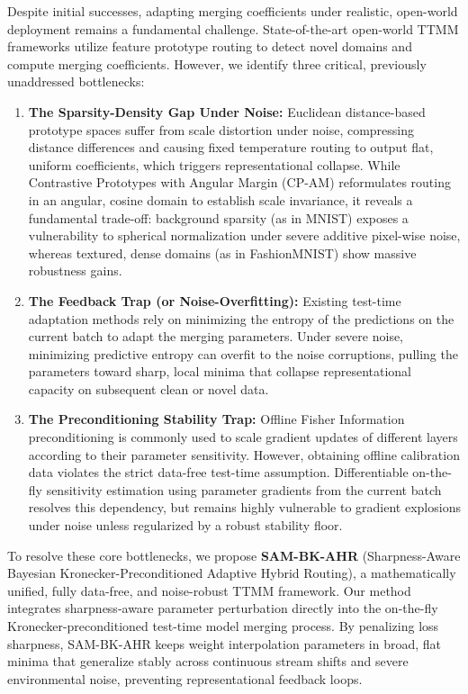 \documentclass{article}
\theoremstyle{plain}
\theoremstyle{definition}
\theoremstyle{remark}
\begin{document}
Despite initial successes, adapting merging coefficients under realistic, open-world deployment remains a fundamental challenge. State-of-the-art open-world TTMM frameworks utilize feature prototype routing to detect novel domains and compute merging coefficients. However, we identify three critical, previously unaddressed bottlenecks:
\begin{enumerate}
    \item \textbf{The Sparsity-Density Gap Under Noise:} Euclidean distance-based prototype spaces suffer from scale distortion under noise, compressing distance differences and causing fixed temperature routing to output flat, uniform coefficients, which triggers representational collapse. While Contrastive Prototypes with Angular Margin (CP-AM) reformulates routing in an angular, cosine domain to establish scale invariance, it reveals a fundamental trade-off: background sparsity (as in MNIST) exposes a vulnerability to spherical normalization under severe additive pixel-wise noise, whereas textured, dense domains (as in FashionMNIST) show massive robustness gains.
    \item \textbf{The Feedback Trap (or Noise-Overfitting):} Existing test-time adaptation methods rely on minimizing the entropy of the predictions on the current batch to adapt the merging parameters. Under severe noise, minimizing predictive entropy can overfit to the noise corruptions, pulling the parameters toward sharp, local minima that collapse representational capacity on subsequent clean or novel data.
    \item \textbf{The Preconditioning Stability Trap:} Offline Fisher Information preconditioning is commonly used to scale gradient updates of different layers according to their parameter sensitivity. However, obtaining offline calibration data violates the strict data-free test-time assumption. Differentiable on-the-fly sensitivity estimation using parameter gradients from the current batch resolves this dependency, but remains highly vulnerable to gradient explosions under noise unless regularized by a robust stability floor.
\end{enumerate}

To resolve these core bottlenecks, we propose \textbf{SAM-BK-AHR} (Sharpness-Aware Bayesian Kronecker-Preconditioned Adaptive Hybrid Routing), a mathematically unified, fully data-free, and noise-robust TTMM framework. Our method integrates sharpness-aware parameter perturbation directly into the on-the-fly Kronecker-preconditioned test-time model merging process. By penalizing loss sharpness, SAM-BK-AHR keeps weight interpolation parameters in broad, flat minima that generalize stably across continuous stream shifts and severe environmental noise, preventing representational feedback loops.
\end{document}
